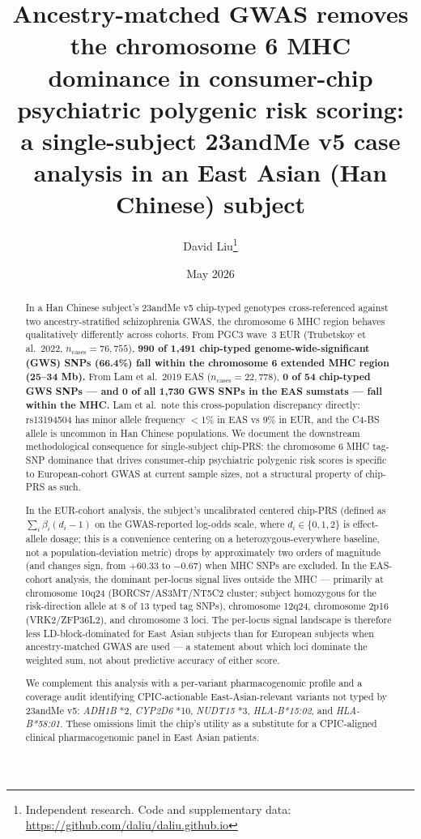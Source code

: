 \documentclass[11pt,a4paper]{article}
\title{\vspace{-2em}\bfseries Ancestry-matched GWAS removes the chromosome 6 MHC dominance in consumer-chip psychiatric polygenic risk scoring: a single-subject 23andMe v5 case analysis in an East Asian (Han Chinese) subject}
\author{David Liu\thanks{Independent research. Code and supplementary data: \url{https://github.com/daliu/daliu.github.io}}}
\date{May 2026}
\begin{document}
\maketitle

\begin{abstract}
\noindent In a Han Chinese subject's 23andMe v5 chip-typed genotypes cross-referenced against two ancestry-stratified schizophrenia GWAS, the chromosome 6 MHC region behaves qualitatively differently across cohorts. From PGC3 wave~3 EUR (Trubetskoy et al.~2022, $n_{\text{cases}}=76{,}755$), \textbf{990 of 1{,}491 chip-typed genome-wide-significant (GWS) SNPs (66.4\%) fall within the chromosome 6 extended MHC region (25--34 Mb).} From Lam et al.~2019 EAS ($n_{\text{cases}}=22{,}778$), \textbf{0 of 54 chip-typed GWS SNPs --- and 0 of all 1{,}730 GWS SNPs in the EAS sumstats --- fall within the MHC.} Lam et al.~note this cross-population discrepancy directly: rs13194504 has minor allele frequency $<1\%$ in EAS vs $9\%$ in EUR, and the C4-BS allele is uncommon in Han Chinese populations. We document the downstream methodological consequence for single-subject chip-PRS: the chromosome 6 MHC tag-SNP dominance that drives consumer-chip psychiatric polygenic risk scores is specific to European-cohort GWAS at current sample sizes, not a structural property of chip-PRS as such.

In the EUR-cohort analysis, the subject's uncalibrated centered chip-PRS (defined as $\sum_i \beta_i (d_i - 1)$ on the GWAS-reported log-odds scale, where $d_i \in \{0,1,2\}$ is effect-allele dosage; this is a convenience centering on a heterozygous-everywhere baseline, not a population-deviation metric) drops by approximately two orders of magnitude (and changes sign, from $+60.33$ to $-0.67$) when MHC SNPs are excluded. In the EAS-cohort analysis, the dominant per-locus signal lives outside the MHC --- primarily at chromosome 10q24 (BORCS7/AS3MT/NT5C2 cluster; subject homozygous for the risk-direction allele at 8 of 13 typed tag SNPs), chromosome 12q24, chromosome 2p16 (VRK2/ZFP36L2), and chromosome 3 loci. The per-locus signal landscape is therefore less LD-block-dominated for East Asian subjects than for European subjects when ancestry-matched GWAS are used --- a statement about which loci dominate the weighted sum, not about predictive accuracy of either score.

We complement this analysis with a per-variant pharmacogenomic profile and a coverage audit identifying CPIC-actionable East-Asian-relevant variants not typed by 23andMe v5: \emph{ADH1B} *2, \emph{CYP2D6} *10, \emph{NUDT15} *3, \emph{HLA-B*15:02}, and \emph{HLA-B*58:01}. These omissions limit the chip's utility as a substitute for a CPIC-aligned clinical pharmacogenomic panel in East Asian patients.
\end{abstract}
\end{document}
